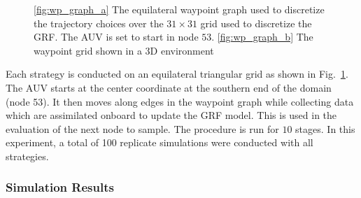 \documentclass[aoas]{imsart}
\begin{document}
\begin{figure}[!b] 
\centering 
{}
\hfill
{}
\caption{\ref{fig:wp_graph_a} The equilateral waypoint graph used to discretize the
trajectory choices over the $31\times31$ grid used to discretize the GRF. The AUV is set to start in node $53$.
\ref{fig:wp_graph_b} The waypoint grid shown in a 3D environment}
\label{fig:wp_graph}
\end{figure}

Each strategy is conducted on an equilateral triangular grid as shown in
Fig.~\ref{fig:wp_graph}. The AUV starts at the center coordinate at
the southern end of the domain (node 53). It then moves along edges in
the waypoint graph while collecting data which are assimilated onboard
to update the GRF model. This is used in the evaluation of the next
node to sample.  The procedure is run for $10$ stages. In this experiment, a total of 100
replicate simulations were conducted with all strategies.

\subsubsection{Simulation Results}
\end{document}
